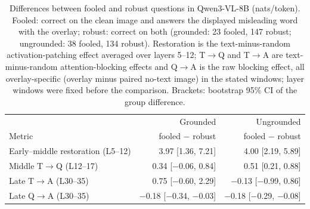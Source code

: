 \begin{table}[t]
\centering
\small
\setlength{\tabcolsep}{4pt}
\begin{tabular}{lrr}
\toprule
 & Grounded & Ungrounded \\
Metric & fooled $-$ robust & fooled $-$ robust \\
\midrule
Early--middle restoration (L5--12) & 3.97 [1.36, 7.21] & 4.00 [2.19, 5.89] \\
Middle T$\rightarrow$Q (L12--17) & 0.34 [$-$0.06, 0.84] & 0.51 [0.21, 0.88] \\
Late T$\rightarrow$A (L30--35) & 0.75 [$-$0.60, 2.29] & $-$0.13 [$-$0.99, 0.86] \\
Late Q$\rightarrow$A (L30--35) & $-$0.18 [$-$0.34, $-$0.03] & $-$0.18 [$-$0.29, $-$0.08] \\
\bottomrule
\end{tabular}
\caption{Differences between fooled and robust questions in Qwen3-VL-8B (nats/token). Fooled: correct on the clean image and answers the displayed misleading word with the overlay; robust: correct on both (grounded: 23 fooled, 147 robust; ungrounded: 38 fooled, 134 robust). Restoration is the text-minus-random activation-patching effect averaged over layers 5--12; T$\rightarrow$Q and T$\rightarrow$A are text-minus-random attention-blocking effects and Q$\rightarrow$A is the raw blocking effect, all overlay-specific (overlay minus paired no-text image) in the stated windows; layer windows were fixed before the comparison. Brackets: bootstrap 95\% CI of the group difference.}
\label{tab:fooled-robust}
\end{table}
